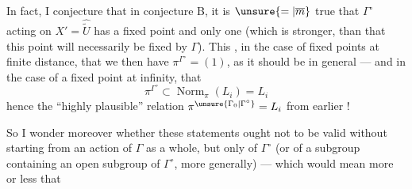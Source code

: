 In fact, I conjecture that in conjecture B, it is $\unsure{=|\overline m}$ true that $\Gamma^\circ$ acting on $X'=\widehat{\widetilde U}$ has a fixed point and only one (which is stronger, than that this  point will necessarily be fixed by $\Gamma$). This , in the case of fixed points at finite distance, that we then have $\pi^{\Gamma^\circ}=(1)$, as it should be in general --- and in the case of a fixed point at infinity, that
\[
\pi^{\Gamma^\circ}\subset\operatorname{Norm}_{\pi}(L_i)=L_i
\]
hence the ``highly plausible'' relation $\pi^{\unsure{\Gamma_0|\Gamma^\circ}}=L_i$ from earlier !

So I wonder moreover whether these statements ought not to be valid without starting from an action of $\Gamma$  as a whole, but only of $\Gamma^\circ$ (or of a subgroup containing an open subgroup of $\Gamma^\circ$, more generally) --- which would mean more or less that
